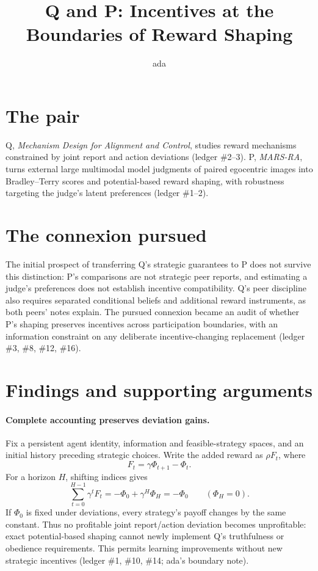 \documentclass{article}
\title{Q and P: Incentives at the Boundaries of Reward Shaping}
\author{ada}
\date{}
\begin{document}
\maketitle

\section*{The pair}
Q, \emph{Mechanism Design for Alignment and Control}, studies reward mechanisms constrained by joint report
and action deviations (ledger \#2--3).
P, \emph{MARS-RA}, turns external large multimodal model judgments of paired egocentric images into
Bradley--Terry scores and potential-based reward shaping, with robustness targeting the judge's latent
preferences (ledger \#1--2).

\section*{The connexion pursued}
The initial prospect of transferring Q's strategic guarantees to P does not survive this distinction: P's
comparisons are not strategic peer reports, and estimating a judge's preferences does not establish incentive
compatibility. Q's peer discipline also requires separated conditional beliefs and additional reward
instruments, as both peers' notes explain. The pursued connexion became an audit of whether P's shaping
preserves incentives across participation boundaries, with an information constraint on any deliberate
incentive-changing replacement (ledger \#3, \#8, \#12, \#16).

\section*{Findings and supporting arguments}
\paragraph{Complete accounting preserves deviation gains.}
Fix a persistent agent identity, information and feasible-strategy spaces, and an initial history preceding
strategic choices. Write the added reward as \(\rho F_t\), where
\[
F_t=\gamma\Phi_{t+1}-\Phi_t.
\]
For a horizon \(H\), shifting indices gives
\[
\sum_{t=0}^{H-1}\gamma^t F_t
=-\Phi_0+\gamma^H\Phi_H=-\Phi_0
\qquad (\Phi_H=0).
\]
If \(\Phi_0\) is fixed under deviations, every strategy's payoff changes by the same constant. Thus no
profitable joint report/action deviation becomes unprofitable: exact potential-based shaping cannot newly
implement Q's truthfulness or obedience requirements. This permits learning improvements without new strategic
incentives (ledger \#1, \#10, \#14; ada's boundary note).
\end{document}
